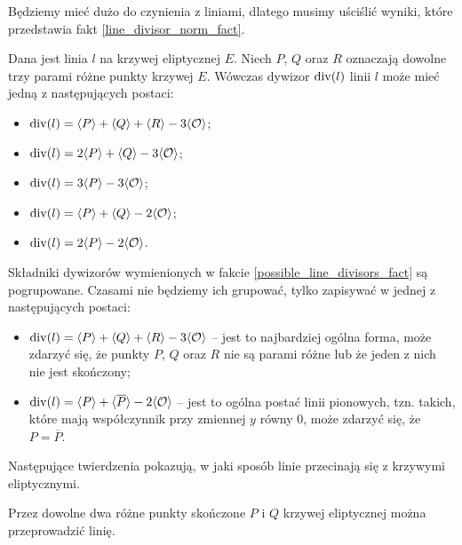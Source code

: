 Będziemy mieć dużo do czynienia z liniami,
dlatego musimy uściślić wyniki,
które przedstawia fakt \ref{line_divisor_norm_fact}.

\begin{fact}\label{possible_line_divisors_fact}
Dana jest linia $l$ na krzywej eliptycznej $E$.
Niech $P$, $Q$ oraz $R$ oznaczają dowolne trzy parami różne punkty krzywej $E$.
Wówczas dywizor $\operatorname{div}(l)$ linii $l$ może mieć jedną z następujących postaci:
\begin{itemize}
\item $\operatorname{div}(l) = \langle P\rangle + \langle Q\rangle + \langle R\rangle - 3\langle\mathcal{O}\rangle$;
\item $\operatorname{div}(l) = 2\langle P\rangle + \langle Q\rangle - 3\langle\mathcal{O}\rangle$;
\item $\operatorname{div}(l) = 3\langle P\rangle - 3\langle\mathcal{O}\rangle$;
\item $\operatorname{div}(l) = \langle P\rangle + \langle Q\rangle - 2\langle\mathcal{O}\rangle$;
\item $\operatorname{div}(l) = 2\langle P\rangle - 2\langle\mathcal{O}\rangle$.
\end{itemize}
\end{fact}

\begin{remark}\label{possible_line_divisors_remark}
Składniki dywizorów wymienionych w fakcie \ref{possible_line_divisors_fact}
są pogrupowane. Czasami nie będziemy ich grupować,
tylko zapisywać w jednej z następujących postaci:
\begin{itemize}
\item $\operatorname{div}(l) = \langle P\rangle + \langle Q\rangle + \langle R\rangle - 3\langle\mathcal{O}\rangle$ --
jest to najbardziej ogólna forma,
może zdarzyć się, że punkty $P$, $Q$ oraz $R$ nie są parami różne
lub że jeden z nich nie jest skończony;
\item $\operatorname{div}(l) = \langle P\rangle + \langle\overline{P}\rangle - 2\langle\mathcal{O}\rangle$ --
jest to ogólna postać linii pionowych,
tzn. takich, które mają współczynnik przy zmiennej $y$ równy $0$,
może zdarzyć się, że $P = \overline{P}$.
\end{itemize}
\end{remark}

Następujące twierdzenia pokazują,
w jaki sposób linie przecinają się z krzywymi eliptycznymi.

\begin{theorem}\label{line_through_two_points_theorem}
Przez dowolne dwa różne punkty skończone $P$ i $Q$ krzywej eliptycznej
można przeprowadzić linię.
\end{theorem}

